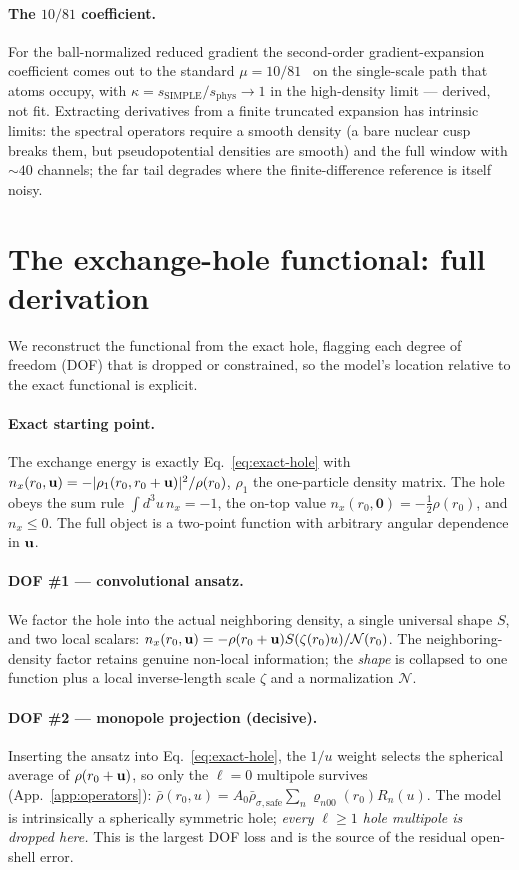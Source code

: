 \paragraph*{The $10/81$ coefficient.}
For the ball-normalized reduced gradient the second-order gradient-expansion
coefficient comes out to the standard $\mu=10/81$~\cite{Antoniewicz_1985} on the
single-scale path that atoms occupy, with $\kappa=s_{\mathrm{SIMPLE}}/s_{\mathrm{phys}}\to1$
in the high-density limit --- derived, not fit. Extracting derivatives from a
finite truncated expansion has intrinsic limits: the spectral operators require a
smooth density (a bare nuclear cusp breaks them, but pseudopotential densities are
smooth) and the full window with $\sim40$ channels; the far tail degrades where
the finite-difference reference is itself noisy.

\section{The exchange-hole functional: full derivation}
\label{app:hole}

We reconstruct the functional from the exact hole, flagging each degree of freedom
(DOF) that is dropped or constrained, so the model's location relative to the exact
functional is explicit.

\paragraph*{Exact starting point.}
The exchange energy is exactly Eq.~\eqref{eq:exact-hole} with
$n_x(r_0,\mathbf{u})=-|\rho_1(r_0,r_0+\mathbf{u})|^2/\rho(r_0)$, $\rho_1$ the one-particle
density matrix. The hole obeys the sum rule $\int d^3u\,n_x=-1$, the on-top value
$n_x(r_0,\mathbf 0)=-\tfrac12\rho(r_0)$, and $n_x\le0$. The full object is a
two-point function with arbitrary angular dependence in $\mathbf{u}$.

\paragraph*{DOF \#1 --- convolutional ansatz.}
We factor the hole into the actual neighboring density, a single universal shape
$S$, and two local scalars:
$n_x(r_0,\mathbf{u})=-\rho(r_0+\mathbf{u})S(\zeta(r_0)u)/\mathcal N(r_0)$. The neighboring-density
factor retains genuine non-local information; the \emph{shape} is collapsed to one
function plus a local inverse-length scale $\zeta$ and a normalization $\mathcal N$.

\paragraph*{DOF \#2 --- monopole projection (decisive).}
Inserting the ansatz into Eq.~\eqref{eq:exact-hole}, the $1/u$ weight selects the
spherical average of $\rho(r_0+\mathbf{u})$, so only the $\ell=0$ multipole survives
(App.~\ref{app:operators}): $\bar\rho(r_0,u)=A_0\bar\rho_{\sigma,\mathrm{safe}}\sum_n \varrho_{n00}(r_0)R_n(u)$. The model is
intrinsically a spherically symmetric hole; \emph{every $\ell\ge1$ hole multipole
is dropped here.} This is the largest DOF loss and is the source of the residual
open-shell error.

